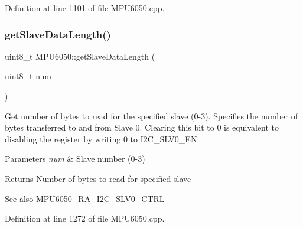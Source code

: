 Definition at line 1101 of file M\+P\+U6050.\+cpp.


\begin{DoxyCode}{0}

\end{DoxyCode}
\mbox{\label{classMPU6050_a54c2a48b3cb79106bcaf75accf6cd311}} 
\subsubsection{\texorpdfstring{getSlaveDataLength()}{getSlaveDataLength()}}
{\footnotesize\ttfamily uint8\+\_\+t M\+P\+U6050\+::get\+Slave\+Data\+Length (\begin{DoxyParamCaption}\item[{uint8\+\_\+t}]{num }\end{DoxyParamCaption})}

Get number of bytes to read for the specified slave (0-\/3). Specifies the number of bytes transferred to and from Slave 0. Clearing this bit to 0 is equivalent to disabling the register by writing 0 to I2\+C\+\_\+\+S\+L\+V0\+\_\+\+EN. 
\begin{DoxyParams}{Parameters}
{\em num} & Slave number (0-\/3) \\
\hline
\end{DoxyParams}
\begin{DoxyReturn}{Returns}
Number of bytes to read for specified slave 
\end{DoxyReturn}
\begin{DoxySeeAlso}{See also}
\mbox{\hyperlink{MPU6050_8h_a70ce4d71982a1e3fb2be9b71f40da786}{M\+P\+U6050\+\_\+\+R\+A\+\_\+\+I2\+C\+\_\+\+S\+L\+V0\+\_\+\+C\+T\+RL}} 
\end{DoxySeeAlso}


Definition at line 1272 of file M\+P\+U6050.\+cpp.


